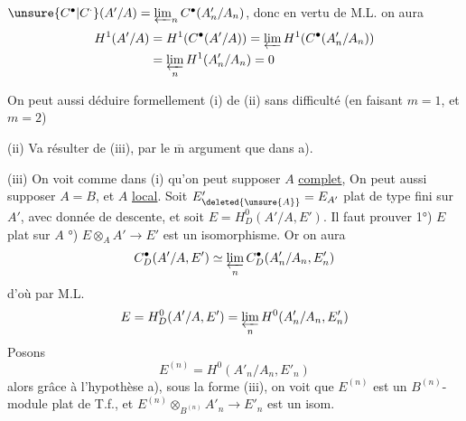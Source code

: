 $\unsure{C^{\bullet}|C^{\cdot}}(A'/A)=\varprojlim_n C^{\bullet}(A'_n/A_n)$, donc en vertu de M.L. on
aura
\[
\begin{aligned}
H^1(A'/A)&=H^1(C^{\bullet}(A'/A))=\varprojlim H^1(C^{\bullet}(A'_n/A_n))\\
&=\varprojlim_n H^1(A'_n/A_n)=0
\end{aligned}
\]

On peut aussi déduire formellement (i) de
(ii) sans difficulté (en faisant $m=1$, et $m=2$)

(ii) Va résulter de (iii), par le $\overline{\mathrm m}$ argument que
dans a).

(iii)  On voit comme dans (i) qu'on peut
supposer $A$  \uline{complet},  On peut aussi supposer
$A=B$, et $A$ \uline{local}. Soit $E'_{\deleted{\unsure{A}}}=E_{A'}$ plat de
type fini sur $A'$, avec donnée de descente, et
soit $E=H^0_D(A'/A,E')$. Il faut prouver
 1°) $E$ plat sur $A$ °) $E\otimes_A A'\to E'$ est un isomorphisme. Or on aura
\[
C^{\bullet}_D(A'/A,E')\simeq\varprojlim_n C^{\bullet}_D(A'_n/A_n,E'_n)
\]
d'où  par M.L.
\[
E=H^0_D(A'/A,E')=\varprojlim_n H^0(A'_n/A_n,E'_n)
\]
Posons
\[
E^{(n)}=H^0(A'_n/A_n,E'_n)
\]
alors grâce à  l'hypothèse a), sous la forme (iii),
on voit que $E^{(n)}$ est un $B^{(n)}$-module plat de
T.f., et $E^{(n)}\otimes_{B^{(n)}} A'_n\to E'_n$ est un isom.
